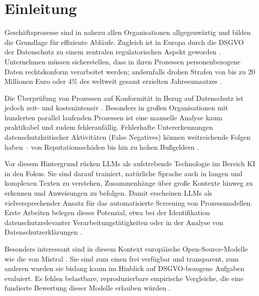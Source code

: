 \chapter{Einleitung}\label{ch:einleitung}

Geschäftsprozesse sind in nahezu allen Organisationen allgegenwärtig und bilden die Grundlage für effiziente Abläufe. Zugleich ist in Europa durch die \ac{DSGVO} der Datenschutz zu einem zentralen regulatorischen Aspekt geworden \cite{Capodieci2023BPMNEnabledDP, GDPR2016}. Unternehmen müssen sicherstellen, dass in ihren Prozessen personenbezogene Daten rechtskonform verarbeitet werden; andernfalls drohen Strafen von bis zu 20 Millionen Euro oder 4\% des weltweit gesamt erzielten Jahresumsatzes \cite{GDPR2016}.


Die Überprüfung von Prozessen auf Konformität in Bezug auf Datenschutz ist jedoch zeit- und kostenintensiv \cite{nake2023towards, varela2025business}. Besonders in großen Organisationen mit hunderten parallel laufenden Prozessen ist eine manuelle Analyse kaum praktikabel und zudem fehleranfällig. Fehlerhafte Untererkennungen datenschutzkritischer Aktivitäten (False Negatives) können weitreichende Folgen haben – von Reputationsschäden bis hin zu hohen Bußgeldern \cite{nake2023towards}.


Vor diesem Hintergrund rücken \acp{LLM} als aufstrebende Technologie im Bereich \ac{KI} in den Fokus. Sie sind darauf trainiert, natürliche Sprache auch in langen und komplexen Texten zu verstehen, Zusammenhänge über große Kontexte hinweg zu erkennen und Anweisungen zu befolgen. Damit erscheinen \acp{LLM} als vielversprechender Ansatz für das automatisierte Screening von Prozessmodellen. Erste Arbeiten belegen dieses Potenzial, etwa bei der Identifikation datenschutzrelevanter Verarbeitungstätigkeiten oder in der Analyse von Datenschutzerklärungen \cite{ciaramella2022leveraging, pragyan2024toward}.


Besonders interessant sind in diesem Kontext europäische Open-Source-Modelle wie die von Mistral \cite{mistralai}. Sie sind zum einen frei verfügbar und transparent, zum anderen wurden sie bislang kaum im Hinblick auf \ac{DSGVO}-bezogene Aufgaben evaluiert. Es fehlen belastbare, reproduzierbare empirische Vergleiche, die eine fundierte Bewertung dieser Modelle erlauben würden \cite{schwerin2024systematic}.



